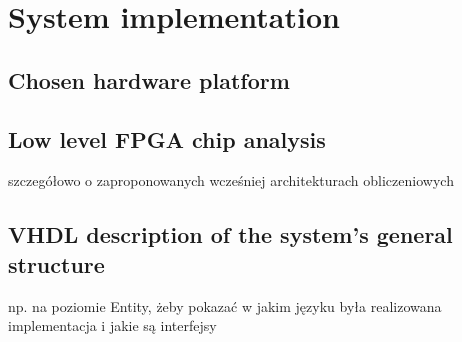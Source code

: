 \section{System implementation}
   
\subsection{Chosen hardware platform}
\subsection{Low level FPGA chip analysis}
szczegółowo o zaproponowanych wcześniej architekturach obliczeniowych
\subsection{VHDL description of the system's general structure}
np. na poziomie Entity, żeby pokazać w jakim języku była realizowana implementacja i jakie są interfejsy